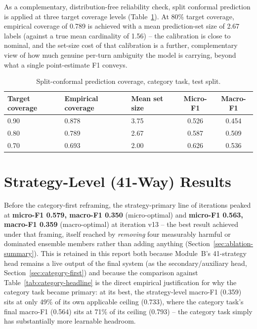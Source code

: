 As a complementary, distribution-free reliability check, split conformal
prediction \citep{vovk2005conformal} is applied at three target coverage
levels (Table~\ref{tab:conformal}). At 80\% target coverage, empirical
coverage of 0.789 is achieved with a mean prediction-set size of 2.67 labels
(against a true mean cardinality of 1.56) -- the calibration is close to
nominal, and the set-size cost of that calibration is a further, complementary
view of how much genuine per-turn ambiguity the model is carrying, beyond
what a single point-estimate F1 conveys.

\begin{table}[H]
\centering
\caption{Split-conformal prediction coverage, category task, test split.}
\label{tab:conformal}
\small
\begin{tabular}{@{}p{2.2cm}p{2.4cm}p{2.2cm}cc@{}}
\toprule
\textbf{Target coverage} & \textbf{Empirical coverage} & \textbf{Mean set size} & \textbf{Micro-F1} & \textbf{Macro-F1} \\
\midrule
0.90 & 0.878 & 3.75 & 0.526 & 0.454 \\
0.80 & 0.789 & 2.67 & 0.587 & 0.509 \\
0.70 & 0.693 & 2.00 & 0.626 & 0.536 \\
\bottomrule
\end{tabular}
\normalsize
\end{table}

\section{Strategy-Level (41-Way) Results}
\label{sec:strategy-results}

Before the category-first reframing, the strategy-primary line of iterations
peaked at \textbf{micro-F1 0.579, macro-F1 0.350} (micro-optimal) and
\textbf{micro-F1 0.563, macro-F1 0.359} (macro-optimal) at iteration v13 --
the best result achieved under that framing, itself reached by \emph{removing}
four measurably harmful or dominated ensemble members rather than adding
anything (Section~\ref{sec:ablation-summary}). This is retained in this
report both because Module~B's 41-strategy head remains a live output of the
final system (as the secondary/auxiliary head, Section~\ref{sec:category-first})
and because the comparison against Table~\ref{tab:category-headline} is the
direct empirical justification for why the category task became primary: at
its best, the strategy-level macro-F1 (0.359) sits at only 49\% of its own
applicable ceiling (0.733), where the category task's final macro-F1 (0.564)
sits at 71\% of its ceiling (0.793) -- the category task simply has
substantially more learnable headroom.

